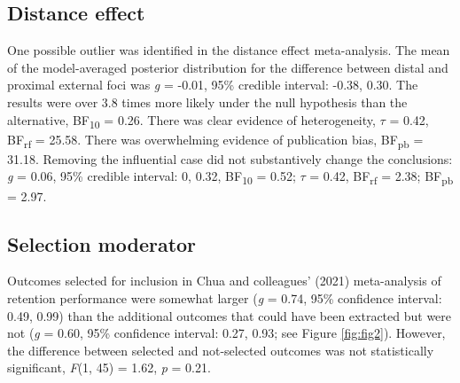 \documentclass[
  man, donotrepeattitle,floatsintext]{apa7}
\begin{document}
\hypertarget{distance-effect}{%
\subsection{Distance effect}\label{distance-effect}}

One possible outlier was identified in the distance effect meta-analysis. The mean of the model-averaged posterior distribution for the difference between distal and proximal external foci was \emph{g} = -0.01, 95\% credible interval: -0.38, 0.30. The results were over 3.8 times more likely under the null hypothesis than the alternative, BF\textsubscript{10} = 0.26. There was clear evidence of heterogeneity, \(\tau\) = 0.42, BF\textsubscript{rf} = 25.58. There was overwhelming evidence of publication bias, BF\textsubscript{pb} = 31.18. Removing the influential case did not substantively change the conclusions: \emph{g} = 0.06, 95\% credible interval: 0, 0.32, BF\textsubscript{10} = 0.52; \(\tau\) = 0.42, BF\textsubscript{rf} = 2.38; BF\textsubscript{pb} = 2.97.

\hypertarget{selection-moderator}{%
\subsection{Selection moderator}\label{selection-moderator}}

Outcomes selected for inclusion in Chua and colleagues' (2021) meta-analysis of retention performance were somewhat larger (\emph{g} = 0.74, 95\% confidence interval: 0.49, 0.99) than the additional outcomes that could have been extracted but were not (\emph{g} = 0.60, 95\% confidence interval: 0.27, 0.93; see Figure \ref{fig:fig2}). However, the difference between selected and not-selected outcomes was not statistically significant, \emph{F}(1, 45) = 1.62, \emph{p} = 0.21.

\clearpage
\vspace{-3em}
\end{document}
